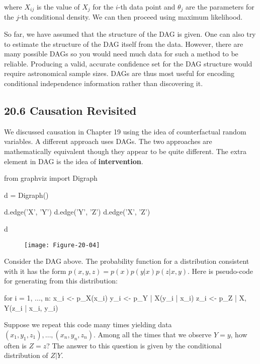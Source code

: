 where \(X_{ij}\) is the value of \(X_{j}\) for the \(i\)-th data point and
\(\theta_{j}\) are the parameters for the \(j\)-th conditional density. We
can then proceed using maximum likelihood.

So far, we have assumed that the structure of the DAG is given. One can
also try to estimate the structure of the DAG itself from the data.
However, there are many possible DAGs so you would need much data for
such a method to be reliable. Producing a valid, accurate confidence set
for the DAG structure would require astronomical sample sizes. DAGs are
thus most useful for encoding conditional independence information
rather than discovering it.

\subsection*{20.6 Causation Revisited}\label{causation-revisited}

We discussed causation in Chapter 19 using the idea of counterfactual
random variables. A different approach uses DAGs. The two approaches
are mathematically equivalent though they appear to be quite different.
The extra element in DAG is the idea of \textbf{intervention}.

\begin{python}
from graphviz import Digraph

d = Digraph()

d.edge('X', 'Y')
d.edge('Y', 'Z')
d.edge('X', 'Z')

d
\end{python}
 
\begin{figure}[H]
\centering
\texttt{[image: Figure-20-04]}
\end{figure}

Consider the DAG above. The probability function for a distribution
consistent with it has the form \(p(x, y, z) = p(x)p(y | x)p(z| x, y)\).
Here is pseudo-code for generating from this distribution:

\begin{console}
for i = 1, ..., n:
  x_{i} <- p_X(x_{i})
  y_{i} <- p_{Y | X}(y_{i} | x_{i})
  z_{i} <- p_{Z | X, Y}(z_{i} | x_{i}, y_{i})
\end{console}

Suppose we repeat this code many times yielding data
\((x_{1}, y_{1}, z_{1}), \dots, (x_{n}, y_{n}, z_{n})\). Among all the times that we
observe \(Y = y\), how often is \(Z = z\)? The answer to this question
is given by the conditional distribution of \(Z | Y\).

